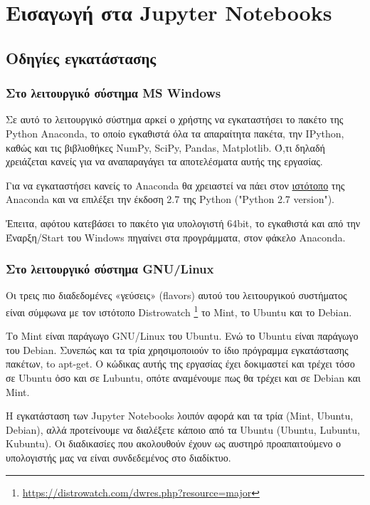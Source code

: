 \documentclass[a4paper,12pt,twoside]{report}
\theoremstyle{plain}
\theoremstyle{definition}
\theoremstyle{remark}
\begin{document}
\newpage
\chapter{Εισαγωγή στα Jupyter Notebooks}
\section{Οδηγίες εγκατάστασης}
\subsection{Στο λειτουργικό σύστημα MS Windows}

Σε αυτό το λειτουργικό σύστημα αρκεί ο χρήστης να εγκαταστήσει το πακέτο της Python Anaconda, το οποίο εγκαθιστά όλα τα απαραίτητα πακέτα, την IPython, καθώς και τις βιβλιοθήκες NumPy, SciPy, Pandas, Matplotlib. Ό,τι δηλαδή χρειάζεται κανείς για να αναπαραγάγει τα αποτελέσματα αυτής της εργασίας.

Για να εγκαταστήσει κανείς το Anaconda θα χρειαστεί να πάει στον 
\href{https://www.continuum.io/downloads#linux}{ιστότοπο}
της Anaconda και να επιλέξει την έκδοση 2.7 της Python ("Python 2.7 version").

Ἐπειτα, αφότου κατεβάσει το πακέτο για υπολογιστή 64bit, το εγκαθιστά και από την Έναρξη/Start του Windows πηγαίνει στα προγράμματα, στον φάκελο Anaconda.

\subsection{Στο λειτουργικό σύστημα GNU/Linux}

Οι τρεις πιο διαδεδομένες «γεύσεις» (flavors) αυτού του λειτουργικού συστήματος είναι σύμφωνα  με τον ιστότοπο Distrowatch \footnote{\url{https://distrowatch.com/dwres.php?resource=major}} το Mint, το Ubuntu και το Debian. 

Το Mint είναι παράγωγο GNU/Linux του Ubuntu. Ενώ το Ubuntu είναι παράγωγο του Debian. Συνεπώς και τα τρία χρησιμοποιούν το ίδιο πρόγραμμα εγκατάστασης πακέτων, to apt-get. Ο κώδικας αυτής της εργασίας έχει δοκιμαστεί και τρέχει τόσο σε Ubuntu ὀσο και σε Lubuntu, οπότε αναμένουμε πως θα τρέχει και σε Debian και Mint.

Η εγκατάσταση των Jupyter Notebooks λοιπόν αφορά και τα τρία (Mint, Ubuntu, Debian), αλλά προτείνουμε να διαλέξετε κάποιο από τα Ubuntu (Ubuntu, Lubuntu, Kubuntu). Οι διαδικασίες που ακολουθούν έχουν ως αυστηρό προαπαιτούμενο ο υπολογιστής μας να είναι συνδεδεμένος στο διαδίκτυο.
\end{document}
